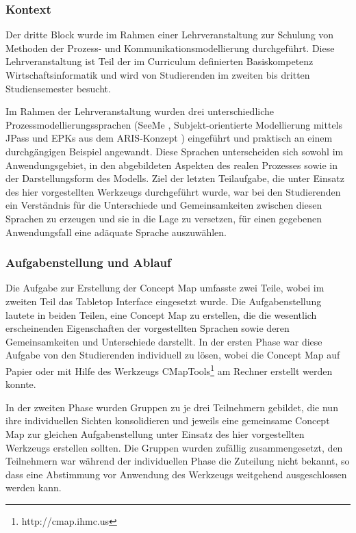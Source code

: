 \subsubsection{Kontext} %
\label{ssub:3_kontext}

Der dritte Block wurde im Rahmen einer Lehrveranstaltung zur Schulung von Methoden der Prozess- und Kommunikationsmodellierung durchgeführt. Diese Lehrveranstaltung ist Teil der im Curriculum definierten Basiskompetenz Wirtschaftsinformatik und wird von Studierenden im zweiten bis dritten Studiensemester besucht.

Im Rahmen der Lehrveranstaltung wurden drei unterschiedliche Prozessmodellierungssprachen (SeeMe \citep{Herrmann04a}, Subjekt-orientierte Modellierung mittels JPass \citep{Fleischmann07} und \gls{EPK}s aus dem ARIS-Konzept \citep{Scheer00}) eingeführt und praktisch an einem durchgängigen Beispiel angewandt. Diese Sprachen unterscheiden sich sowohl im Anwendungsgebiet, in den abgebildeten Aspekten des realen Prozesses sowie in der Darstellungsform des Modells. Ziel der letzten Teilaufgabe, die unter Einsatz des hier vorgestellten Werkzeugs durchgeführt wurde, war bei den Studierenden ein Verständnis für die Unterschiede und Gemeinsamkeiten zwischen diesen Sprachen zu erzeugen und sie in die Lage zu versetzen, für einen gegebenen Anwendungsfall eine adäquate Sprache auszuwählen.  


\subsubsection{Aufgabenstellung und Ablauf} %
\label{ssub:3_aufgabenstellung}

Die Aufgabe zur Erstellung der Concept Map umfasste zwei Teile, wobei im zweiten Teil das Tabletop Interface eingesetzt wurde. Die Aufgabenstellung lautete in beiden Teilen, eine Concept Map zu erstellen, die die wesentlich erscheinenden Eigenschaften der vorgestellten Sprachen sowie deren Gemeinsamkeiten und Unterschiede darstellt. In der ersten Phase war diese Aufgabe von den Studierenden individuell zu lösen, wobei die Concept Map auf Papier oder mit Hilfe des Werkzeugs CMapTools\footnote{http://cmap.ihmc.us} \citep{Canas04} am Rechner erstellt werden konnte. 

In der zweiten Phase wurden Gruppen zu je drei Teilnehmern gebildet, die nun ihre individuellen Sichten konsolidieren und jeweils eine gemeinsame Concept Map zur gleichen Aufgabenstellung unter Einsatz des hier vorgestellten Werkzeugs erstellen sollten. Die Gruppen wurden zufällig zusammengesetzt, den Teilnehmern war während der individuellen Phase die Zuteilung nicht bekannt, so dass eine Abstimmung vor Anwendung des Werkzeugs weitgehend ausgeschlossen werden kann.

